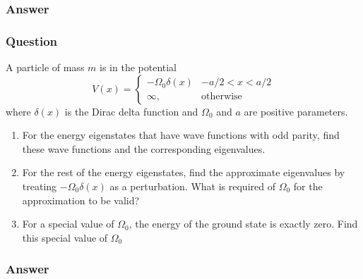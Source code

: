 \subsubsection{Answer}



\subsubsection{Question}

A particle of mass $m$ is in the potential
\begin{equation}
V(x)= \begin{cases}
		-\Omega_0\delta(x) &-a/2<x<a/2\\
		\infty, &\text{otherwise}
\end{cases}
\end{equation}
where $\delta(x)$ is the Dirac delta function and $\Omega_0$ and $a$ are positive parameters.
\begin{enumerate}
	\item For the energy eigenstates that have wave functions with odd parity, find these wave functions and the corresponding eigenvalues.
	\item For the rest of the energy eigenstates, find the approximate eigenvalues by treating $-\Omega_0\delta(x)$ as a perturbation. What is required of $\Omega_0$ for the approximation to be valid? 
	\item For a special value of $\Omega_0$, the energy of the ground state is exactly zero. Find this special value of $\Omega_0$
\end{enumerate}
\subsubsection{Answer}



